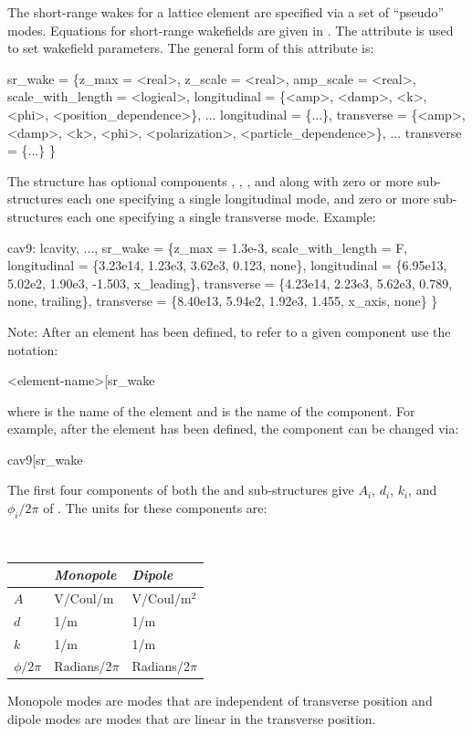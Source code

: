 The short-range wakes for a lattice element are specified via a set of ``pseudo'' modes.  Equations
for short-range wakefields are given in .  The  attribute is used to set
wakefield parameters. The general form of this attribute is:
\begin{example}
  sr_wake = \{z_max = <real>, z_scale = <real>, amp_scale = <real>, 
      scale_with_length = <logical>,
      longitudinal = \{<amp>, <damp>, <k>, <phi>, <position_dependence>\},
      ...
      longitudinal = \{...\}, 
      transverse = \{<amp>, <damp>, <k>, <phi>, <polarization>, <particle_dependence>\},
      ...
      transverse = \{...\} \}
\end{example}
The  structure has optional components , , , and
 along with zero or more  sub-structures each one specifying
a single longitudinal mode, and zero or more  sub-structures each one specifying a
single transverse mode. Example:
\begin{example}
  cav9: lcavity, ..., sr_wake = \{z_max = 1.3e-3, scale_with_length = F, 
       longitudinal = \{3.23e14, 1.23e3, 3.62e3, 0.123, none\}, 
       longitudinal = \{6.95e13, 5.02e2, 1.90e3, -1.503, x_leading\}, 
       transverse = \{4.23e14, 2.23e3, 5.62e3, 0.789, none,  trailing\},
       transverse = \{8.40e13, 5.94e2, 1.92e3, 1.455, x_axis, none\} \}
\end{example}
Note: After an element has been defined, to refer to a given component use the notation:
\begin{example}
  <element-name>[sr_wake%
\end{example}
where  is the name of the element and  is the name of the component.
For example, after the  element has been defined, the  component can be changed via:
\begin{example}
  cav9[sr_wake%
\end{example}

The first four components of both the  and  sub-structures give
$A_i$, $d_i$, $k_i$, and $\phi_i/2\pi$ of . The units for these components are:
\begin{center} \tt
\begin{tabular}{lll} \toprule
                & {\em Monopole}  & {\em Dipole}     \\ \midrule
  $A$           & V/Coul/m        & V/Coul/m$^2$     \\
  $d$           & 1/m             & 1/m              \\
  $k$           & 1/m             & 1/m              \\
  $\phi/2\pi$   & Radians/2$\pi$  & Radians/2$\pi$   \\ \bottomrule
\end{tabular}
\end{center}
Monopole modes are modes that are independent of transverse position and dipole modes are modes that
are linear in the transverse position. 

